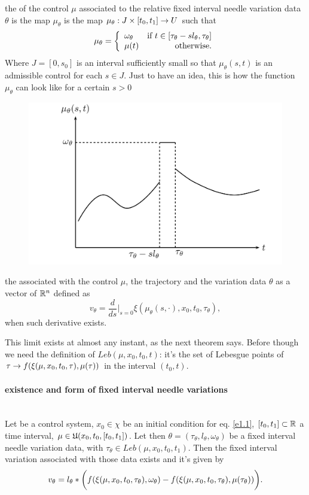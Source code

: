 {	\item the  of the control $\mu$ associated to the relative fixed interval needle variation data $\theta$ is the map $\mu_\theta$ is the map $\mu_\theta:J\times[t_0,t_1]\rightarrow U$ such that
	\[\mu_\theta = \left\{ \begin{array}{lr}
	\omega_\theta & \mbox{if $t\in[\tau_\theta-sl_\theta,\tau_\theta]$}\\
	\mu(t) & \mbox{otherwise}.\end{array}
	\right.	\]
	Where $J=[0,s_0]$ is an interval sufficiently small so that $\mu_\theta(s,t)$ is an admissible control for each $s\in J$.
	Just to have an idea, this is how the function $\mu_\theta$ can look like for a certain $s>0$
	\begin{figure}[H]
		\includegraphics[width=\linewidth]{imgs/needle-variation.png}
		\caption{}
		\label{fig-needle-variation}
	\end{figure}
	\item the  associated with the control $\mu$, the trajectory \trajWinCond{\cdot} and the variation data $\theta$ as a vector of $\mathbb{R}^n$ defined as 
	\[v_\theta = \frac{d}{ds}\bigg|_{s=0} \xi(\mu_\theta(s,\cdot),x_0,t_0,\tau_\theta),\] when such derivative exists.
}
This limit exists at almost any instant, as the next theorem says. Before though we need the definition of $Leb(\mu,x_0,t_0,t)$: it's the set of Lebesgue points of $\tau\rightarrow f(\xi(\mu,x_0,t_0,\tau),\mu(\tau))$ in the interval $(t_0,t)$.

\paragraph[prop 4.9]{existence and form of fixed interval needle variations}\mbox{}\\
 Let \controlSystem\space be a control system, $x_0\in\chi$ be an initial condition for eq. \eqref{e1.1}, $[t_0,t_1]\subset\mathbb{R}$ a time interval, $\mu\in\mathfrak{U}(x_0,t_0,[t_0,t_1])$. Let then $\theta=(\tau_\theta,l_\theta,\omega_\theta)$ be a fixed interval needle variation data, with $\tau_\theta\in Leb(\mu,x_0,t_0,t_1)$. Then the fixed interval variation associated with those data exists and it's given by
\[ v_\theta=l_\theta*\bigg(f(\xi(\mu,x_0,t_0,\tau_\theta),\omega_\theta) - f(\xi(\mu,x_0,t_0,\tau_\theta),\mu(\tau_\theta) )  \bigg). \]

